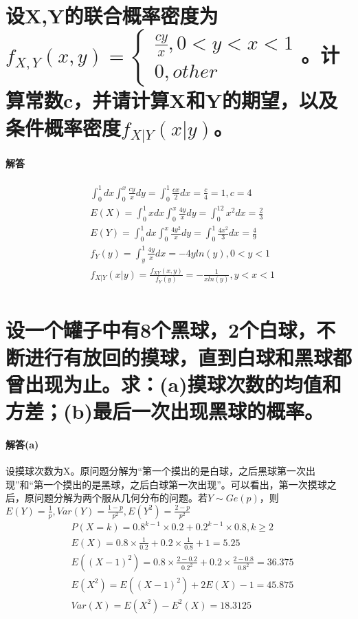 \documentclass[UTF8]{ctexart}
\begin{document}
\section{设X,Y的联合概率密度为$f_{X,Y}(x,y)=\begin{cases}\frac{cy}{x},0<y<x<1\\
0,other\end{cases}$。计算常数c，并请计算X和Y的期望，以及条件概率密度$f_{X\lvert Y}(x\lvert y)$。}
\paragraph{解答}
\begin{equation*}
\begin{aligned}
&\int_0^1dx\int_0^x\frac{cy}{x}dy=\int_0^1\frac{cx}{2}dx=\frac{c}{4}=1,c=4\\
&E(X)=\int^1_0xdx\int_0^x\frac{4y}{x}dy=\int_0^12x^2dx=\frac{2}{3}\\
&E(Y)=\int_0^1dx\int_0^x\frac{4y^2}{x}dy=\int_0^1\frac{4x^2}{3}dx=\frac{4}{9}\\
&f_Y(y)=\int^1_y\frac{4y}{x}dx=-4yln(y),0<y<1\\
&f_{X\lvert Y}(x\lvert y)=\frac{f_{XY}(x,y)}{f_Y(y)}=-\frac{1}{xln(y)}, y<x<1\\
\end{aligned}
\end{equation*}
\section{设一个罐子中有8个黑球，2个白球，不断进行有放回的摸球，直到白球和黑球都曾出现为止。求：(a)摸球次数的均值和方差；(b)最后一次出现黑球的概率。}
\paragraph{解答(a)}
设摸球次数为X。原问题分解为“第一个摸出的是白球，之后黑球第一次出现”和“第一个摸出的是黑球，之后白球第一次出现”。可以看出，第一次摸球之后，原问题分解为两个服从几何分布的问题。若$Y\sim Ge(p)$，则$E(Y)=\frac{1}{p},Var(Y)=\frac{1-p}{p^2},E(Y^2)=\frac{2-p}{p^2}$
\begin{equation*}
\begin{aligned}
&P(X=k)=0.8^{k-1}\times0.2+0.2^{k-1}\times0.8,k\geq 2\\
&E(X)=0.8\times\frac{1}{0.2}+0.2\times\frac{1}{0.8}+1=5.25\\
&E((X-1)^2)=0.8\times\frac{2-0.2}{0.2^2}+0.2\times\frac{2-0.8}{0.8^2}=36.375\\
&E(X^2)=E((X-1)^2)+2E(X)-1=45.875\\
&Var(X)=E(X^2)-E^2(X)=18.3125\\
\end{aligned}
\end{equation*}
\end{document}
